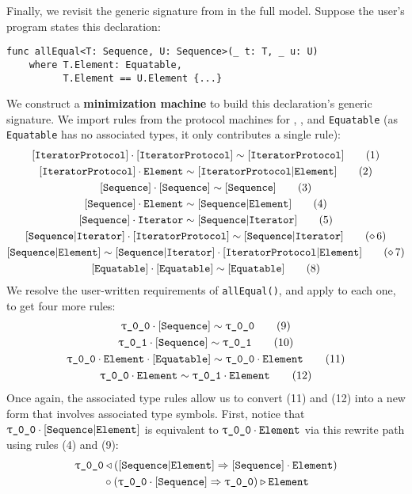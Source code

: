\documentclass[../generics]{subfiles}
\begin{document}
\begin{example}
Finally, we revisit the generic signature from  in the full model. Suppose the user's program states this declaration:
\begin{Verbatim}
func allEqual<T: Sequence, U: Sequence>(_ t: T, _ u: U)
    where T.Element: Equatable,
          T.Element == U.Element {...}
\end{Verbatim}
We construct a \textbf{minimization machine} to build this declaration's generic signature. We import rules from the protocol machines for \tIterator, \tSequence, and \texttt{Equatable} (as \texttt{Equatable} has no associated types, it only contributes a single rule):
\begin{gather*}
\ConfRule{\pIterator}{\pIterator} \tag{1}\\
\AssocRule{IteratorProtocol}{Element} \tag{2}\\
\ConfRule{\pSequence}{\pSequence}\tag{3}\\
\AssocRule{Sequence}{Element}\tag{4}\\
\AssocRule{Sequence}{Iterator}\tag{5}\\
\ConfRule{\assocsym{Sequence}{Iterator}}{\pIterator} \tag{\CRule{6}} \\
\SameRule{\assocsym{Sequence}{Element}}{\assocsym{Sequence}{Iterator}\cdot\assocsym{IteratorProtocol}{Element}} \tag{\CRule{7}}\\
\ConfRule{\protosym{Equatable}}{\protosym{Equatable}}\tag{8}
\end{gather*}
We resolve the user-written requirements of \texttt{allEqual()}, and apply  to each one, to get four more rules:
\begin{gather*}
\ConfRule{\rT}{\pSequence}\tag{9}\\
\ConfRule{\rU}{\pSequence}\tag{10}\\
\ConfRule{\rT\cdot\nElement}{\protosym{Equatable}}\tag{11}\\
\SameRule{\rT\cdot\nElement}{\rU\cdot\nElement}\tag{12}
\end{gather*}
Once again, the associated type rules allow us to convert (11) and (12) into a new form that involves associated type symbols. First, notice that $\rT\cdot\assocsym{Sequence}{Element}$ is equivalent to $\rT\cdot\nElement$ via this rewrite path using rules (4) and (9):
\begin{gather*}
\rT \WL (\assocsym{Sequence}{Element} \Rightarrow \pSequence\cdot\nElement)\\
{} \circ (\rT\cdot\pSequence \Rightarrow \rT) \WR \nElement

\end{gather*}
\end{example}
\end{document}
